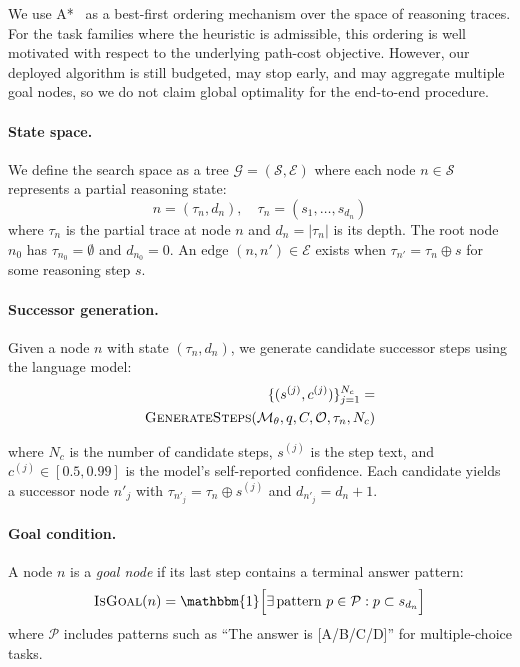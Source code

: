 \documentclass[11pt]{article}
\begin{document}
We use A*~\cite{hart1968formal} as a best-first ordering mechanism over the space of reasoning traces. For the task families where the heuristic is admissible, this ordering is well motivated with respect to the underlying path-cost objective. However, our deployed algorithm is still budgeted, may stop early, and may aggregate multiple goal nodes, so we do not claim global optimality for the end-to-end procedure.

\paragraph{State space.} We define the search space as a tree $\mathcal{G} = (\mathcal{S}, \mathcal{E})$ where each node $n \in \mathcal{S}$ represents a partial reasoning state:
\begin{equation}
n = (\tau_n, d_n), \quad \tau_n = (s_1, \ldots, s_{d_n})
\end{equation}
where $\tau_n$ is the partial trace at node $n$ and $d_n = |\tau_n|$ is its depth. The root node $n_0$ has $\tau_{n_0} = \emptyset$ and $d_{n_0} = 0$. An edge $(n, n') \in \mathcal{E}$ exists when $\tau_{n'} = \tau_n \oplus s$ for some reasoning step $s$.

\paragraph{Successor generation.} Given a node $n$ with state $(\tau_n, d_n)$, we generate candidate successor steps using the language model:
\begin{equation}
\begin{aligned}
      \{(s^{(j)}, c^{(j)})\}_{j=1}^{N_c} = \\\textsc{GenerateSteps}(\mathcal{M}_\theta, q, C, \mathcal{O}, \tau_n, N_c)
\end{aligned}
  \label{eq:successor}
\end{equation}

where $N_c$ is the number of candidate steps, $s^{(j)}$ is the step text, and $c^{(j)} \in [0.5, 0.99]$ is the model's self-reported confidence. Each candidate yields a successor node $n'_j$ with $\tau_{n'_j} = \tau_n \oplus s^{(j)}$ and $d_{n'_j} = d_n + 1$.

\paragraph{Goal condition.} A node $n$ is a \emph{goal node} if its last step contains a terminal answer pattern:
\begin{equation}
\textsc{IsGoal}(n) = \mathbbm{1}\Big[\exists\, \text{pattern } p \in \mathcal{P}: p \subset s_{d_n}\Big]
\end{equation}
where $\mathcal{P}$ includes patterns such as ``The answer is [A/B/C/D]'' for multiple-choice tasks.
\end{document}
